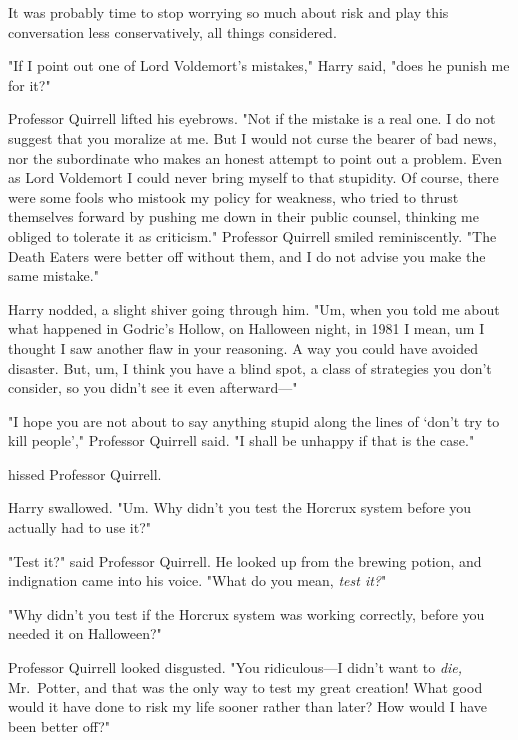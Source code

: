 It was probably time to stop worrying so much about risk and play this
conversation less conservatively, all things considered.

"If I point out one of Lord Voldemort's mistakes," Harry said, "does he punish
me for it?"

Professor Quirrell lifted his eyebrows. "Not if the mistake is a real one. I do
not suggest that you moralize at me. But I would not curse the bearer of bad
news, nor the subordinate who makes an honest attempt to point out a problem.
Even as Lord Voldemort I could never bring myself to that stupidity. Of course,
there were some fools who mistook my policy for weakness, who tried to thrust
themselves forward by pushing me down in their public counsel, thinking me
obliged to tolerate it as criticism." Professor Quirrell smiled reminiscently.
"The Death Eaters were better off without them, and I do not advise you make
the same mistake."

Harry nodded, a slight shiver going through him. "Um, when you told me about
what happened in Godric's Hollow, on Halloween night, in 1981 I mean,
um{\el} I thought I saw another flaw in your reasoning. A way you could have
avoided disaster. But, um, I think you have a blind spot, a class of strategies
you don't consider, so you didn't see it even afterward\mbox{---}"

"I hope you are not about to say anything stupid along the lines of `don't try
to kill people'," Professor Quirrell said. "I shall be unhappy if that is the
case."


 hissed Professor Quirrell. 

Harry swallowed. "Um. Why didn't you test the Horcrux system before you
actually had to use it?"

"Test it?" said Professor Quirrell. He looked up from the brewing potion, and
indignation came into his voice. "What do you mean, \emph{test it?}"

"Why didn't you test if the Horcrux system was working correctly, before you
needed it on Halloween?"

Professor Quirrell looked disgusted. "You ridiculous---I didn't want to
\emph{die,} Mr.~Potter, and that was the only way to test my great creation!
What good would it have done to risk my life sooner rather than later? How
would I have been better off?"

